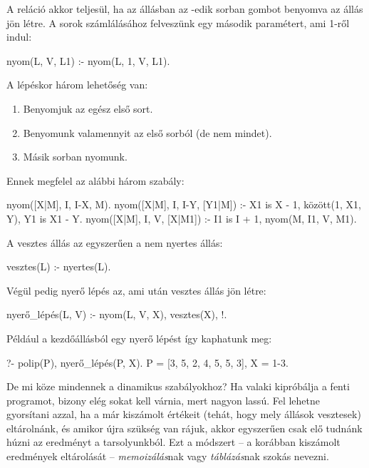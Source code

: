 A  reláció akkor teljesül, ha az  állásban
az -edik sorban  gombot benyomva az  állás jön létre.
A sorok számlálásához felveszünk egy második paramétert, ami 1-ről indul:
\begin{program}
nyom(L, V, L1) :- nyom(L, 1, V, L1).
\end{program}
A lépéskor három lehetőség van:
\begin{enumerate}
\item Benyomjuk az egész első sort.
\item Benyomunk valamennyit az első sorból (de nem mindet).
\item Másik sorban nyomunk.
\end{enumerate}
Ennek megfelel az alábbi három szabály:
\begin{program}
nyom([X|M], I, I-X, M).
nyom([X|M], I, I-Y, [Y1|M]) :-
    X1 is X - 1, között(1, X1, Y), Y1 is X1 - Y.
nyom([X|M], I, V, [X|M1]) :-
    I1 is I + 1, nyom(M, I1, V, M1).
\end{program}

A vesztes állás az egyszerűen a nem nyertes állás:
\begin{program}
vesztes(L) :- \+ nyertes(L).
\end{program}

Végül pedig nyerő lépés az, ami után vesztes állás jön létre:
\begin{program}
nyerő_lépés(L, V) :- nyom(L, V, X), vesztes(X), !.
\end{program}

Például a kezdőállásból egy nyerő lépést így kaphatunk meg:
\begin{query}
?- polip(P), nyerő_lépés(P, X).
P = [3, 5, 2, 4, 5, 5, 3],
X = 1-3. %
\end{query}

De mi köze mindennek a dinamikus szabályokhoz?
Ha valaki kipróbálja a fenti programot, bizony elég sokat kell várnia,
mert nagyon lassú. Fel lehetne gyorsítani azzal, ha a 
már kiszámolt értékeit (tehát, hogy mely állások vesztesek) eltárolnánk,
és amikor újra szükség van rájuk, akkor egyszerűen csak elő tudnánk húzni
az eredményt a tarsolyunkból. Ezt a módszert -- a korábban kiszámolt
eredmények eltárolását -- \emph{memoizálás}\/nak vagy \emph{táblázás}\/nak
szokás nevezni.

